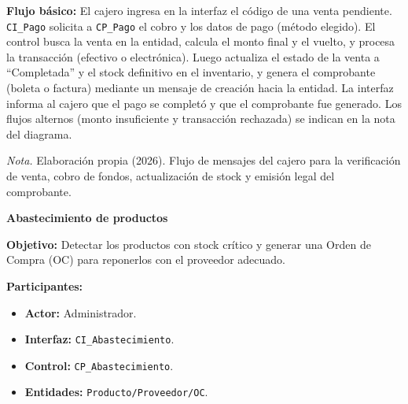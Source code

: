 \documentclass[12pt,a4paper]{article}
\begin{document}
\begin{landscape}
\begin{minipage}[t]{0.40\linewidth}
\medskip
\textbf{Flujo b\'asico:} El cajero ingresa en la interfaz el c\'odigo de una venta pendiente. \texttt{CI\_Pago} solicita a \texttt{CP\_Pago} el cobro y los datos de pago (m\'etodo elegido). El control busca la venta en la entidad, calcula el monto final y el vuelto, y procesa la transacci\'on (efectivo o electr\'onica). Luego actualiza el estado de la venta a ``Completada'' y el stock definitivo en el inventario, y genera el comprobante (boleta o factura) mediante un mensaje de creaci\'on hacia la entidad. La interfaz informa al cajero que el pago se complet\'o y que el comprobante fue generado. Los flujos alternos (monto insuficiente y transacci\'on rechazada) se indican en la nota del diagrama.
\end{minipage}\hfill
\begin{minipage}[t]{0.58\linewidth}
\vspace{0pt}
\centering
{}
\label{fig:seq_cus02}
\resizebox{!}{0.46\textheight}{}
\par\vspace{0.5ex}
{\raggedright \small \emph{Nota.} Elaboraci\'on propia (2026). Flujo de mensajes del cajero para la verificaci\'on de venta, cobro de fondos, actualizaci\'on de stock y emisi\'on legal del comprobante.\par}
\end{minipage}

\clearpage
\par\vspace{0.3cm}

\noindent\begin{minipage}[t]{0.40\linewidth}
\vspace{0pt}
\small \singlespacing \raggedright
\textbf{Abastecimiento de productos}

\medskip
\textbf{Objetivo:} Detectar los productos con stock cr\'itico y generar una Orden de Compra (OC) para reponerlos con el proveedor adecuado.

\medskip
\textbf{Participantes:}
\begin{itemize}\setlength{\itemsep}{1pt}\setlength{\parskip}{0pt}
  \item \textbf{Actor:} Administrador.
  \item \textbf{Interfaz:} \texttt{CI\_Abastecimiento}.
  \item \textbf{Control:} \texttt{CP\_Abastecimiento}.
  \item \textbf{Entidades:} \texttt{Producto/Proveedor/OC}.
\end{itemize}


\end{minipage}
\end{landscape}
\end{document}
